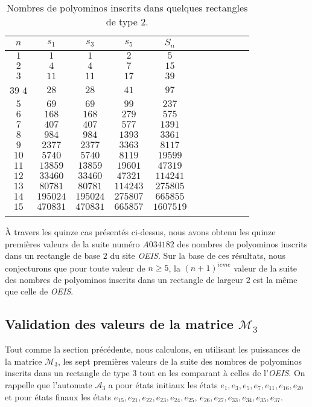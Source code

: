 \begin{small}
\begin{longtable}{|c|c|c|c|c|c|c|c|c|c|c|} 
\hline
$n$&$s_{1}$&$s_{3}$&$s_{5}$&$S_{n}$\\
\hline
$1$& $ 1 $&  $1 $& $ 2$&$ 5$\\
\hline
$2$& $ 4$& $ 4$& $ 7$&$15 $\\
\hline
$3$& $11 $& $11 $& $17 $&$39 $\\
\hline39
$4$& $ 28$& $28 $& $ 41$&$ 97$\\
\hline
$5$& $69 $& $69 $& $99 $&$237 $\\
\hline
$6$& $168$& $168$& $279$&$575$\\
\hline
$7$&$407$ &$407$ &$577$ &$1391$\\
\hline
$8$&$984$ & $984$&$1393$ &$ 3361
$\\
\hline
$9$& $2377$& $2377$&$3363$ &$8117$\\
\hline
$10$&$5740$ &$5740$ & $8119$&$19599$\\
\hline
$11$& $13859$&$13859$ & $19601$&$47319$\\
\hline
$12$&$33460$ & $33460$& $47321$&$114241$\\
\hline
$13$&$80781$ & $80781$& $114243$&$275805
$\\
\hline
$14$&$195024$ & $195024$&$275807$ &$665855$\\
\hline
$15$& $470831$&$470831$& $665857$&$1607519$\\
\hline
\caption{\label{v2} Nombres de polyominos inscrits dans quelques rectangles de type $2$.}
\end{longtable}
\end{small}
À travers les quinze cas présentés  ci-dessus, nous avons obtenu les quinze premières valeurs de la suite numéro $A034182 $ des nombres de polyominos inscrits dans un rectangle de base $2$ du site \emph{OEIS}. Sur la base de ces résultats, nous conjecturons que pour toute valeur de $n\geq 5$, la $(n+1)^{ieme}$ valeur de la suite des nombres de polyominos inscrits dans un rectangle de largeur $2$ est la même que celle de \emph{OEIS}.
\begin{spacing}{0.30}
\subsection{Validation des valeurs de la matrice $\mathcal{M}_{3}$}
\end{spacing}
Tout comme la section précédente, nous calculons, en utilisant les puissances de la matrice $\mathcal{M}_{3}$, les sept premières valeurs de la suite des nombres de polyominos inscrits dans un rectangle de type $3$ tout en les comparant à celles de l'\emph{OEIS}. On rappelle que  l'automate $\mathcal{A}_{3 }$ a pour   états  initiaux les états $e_{1}, e_{3}, e_{5}, e_{7}, e_{11}, e_{16}, e_{20}$ et pour états finaux les états $e_{15},  e_{21}, e_{22}, e_{23}, e_{24}, e_{25}$, $ e_{26}, e_{27}, e_{33}, e_{34},  e_{35},  e_{37}. $

